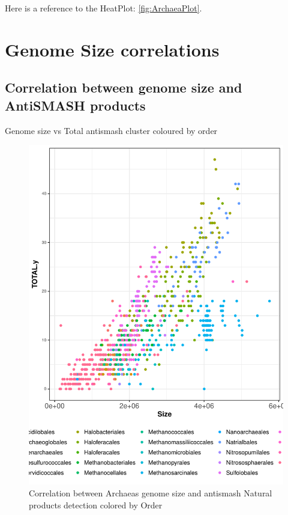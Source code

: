 \documentclass[12pt,twoside]{reedthesis}
\begin{document}
  Here is a reference to the HeatPlot: \autoref{fig:ArchaeaPlot}.
  \clearpage 
  
  \section{Genome Size correlations}\label{genome-size-correlations}
  
  \subsection{Correlation between genome size and AntiSMASH
  products}\label{correlation-between-genome-size-and-antismash-products}
  
  Genome size vs Total antismash cluster coloured by order
  
  \begin{figure}[h!tbp]
  \centering
  \includegraphics[angle = 0,scale = 0.6]{chapter2/Archaeas/ArchaeasSMASHvsSizebyOrder.pdf}
  \caption[Correlation between Archaeas genome size and antismash Natural products detection colored by Order]{\normalsize{Correlation between Archaeas genome size and antismash Natural products detection colored by Order}}
  \label{fig:ArchaeasSMASHvsSizebyOrder}
  \end{figure}
  
\end{document}
